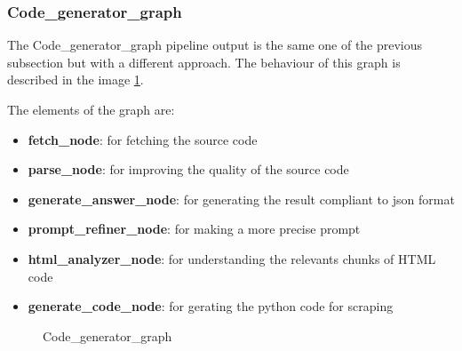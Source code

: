 \subsubsection{Code\_generator\_graph}

The Code\_generator\_graph pipeline output is the same one of the previous subsection but with a different approach. The behaviour of this graph is described in the image \ref{fig:code-generator}.

The elements of the graph are:
\begin{itemize}
    \item \textbf{fetch\_node}: for fetching the source code
    \item \textbf{parse\_node}: for improving the quality of the source code 
    \item \textbf{generate\_answer\_node}: for generating the result compliant to json format
    \item \textbf{prompt\_refiner\_node}: for making a more precise prompt
    \item \textbf{html\_analyzer\_node}: for understanding the relevants chunks of HTML code 
    \item \textbf{generate\_code\_node}: for gerating the python code for scraping
\end{itemize}

\begin{figure}[H]
    \centering
    \caption{Code\_generator\_graph}
    \label{fig:code-generator}
\end{figure}



